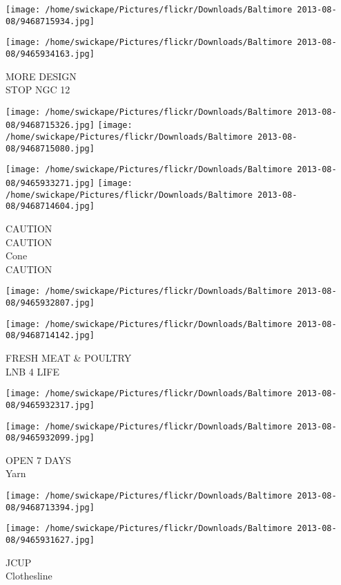 \documentclass[10pt,letterpaper]{article}
\begin{document}
\texttt{[image: /home/swickape/Pictures/flickr/Downloads/Baltimore 2013-08-08/9468715934.jpg]}

\vspace{0.25in}
\texttt{[image: /home/swickape/Pictures/flickr/Downloads/Baltimore 2013-08-08/9465934163.jpg]}

MORE DESIGN\\
STOP NGC 12
\pagebreak

\texttt{[image: /home/swickape/Pictures/flickr/Downloads/Baltimore 2013-08-08/9468715326.jpg]}
\texttt{[image: /home/swickape/Pictures/flickr/Downloads/Baltimore 2013-08-08/9468715080.jpg]}

\texttt{[image: /home/swickape/Pictures/flickr/Downloads/Baltimore 2013-08-08/9465933271.jpg]}
\texttt{[image: /home/swickape/Pictures/flickr/Downloads/Baltimore 2013-08-08/9468714604.jpg]}

CAUTION\\
CAUTION\\
Cone\\
CAUTION
\pagebreak

\texttt{[image: /home/swickape/Pictures/flickr/Downloads/Baltimore 2013-08-08/9465932807.jpg]}

\vspace{0.25in}
\texttt{[image: /home/swickape/Pictures/flickr/Downloads/Baltimore 2013-08-08/9468714142.jpg]}

FRESH MEAT \& POULTRY\\
LNB 4 LIFE
\pagebreak

\texttt{[image: /home/swickape/Pictures/flickr/Downloads/Baltimore 2013-08-08/9465932317.jpg]}

\vspace{0.25in}
\texttt{[image: /home/swickape/Pictures/flickr/Downloads/Baltimore 2013-08-08/9465932099.jpg]}

OPEN 7 DAYS\\
Yarn
\pagebreak

\texttt{[image: /home/swickape/Pictures/flickr/Downloads/Baltimore 2013-08-08/9468713394.jpg]}

\vspace{0.25in}
\texttt{[image: /home/swickape/Pictures/flickr/Downloads/Baltimore 2013-08-08/9465931627.jpg]}

JCUP\\
Clothesline
\pagebreak
\end{document}
